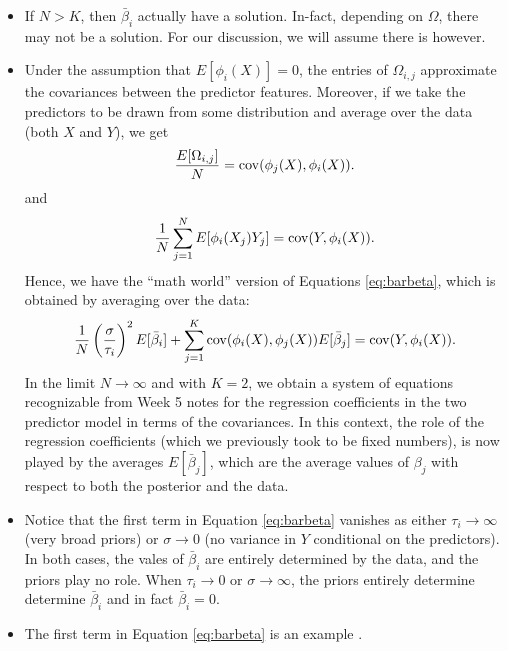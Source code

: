 \begin{itemize}
\item If $N> K$, then $\bar{\beta}_i$ actually have a solution. In-fact, depending on $\Omega$, there may not be a solution. For our discussion, we will assume there is however. 
\item Under the assumption that $E[\phi_i(X)]=0$, the entries of $\Omega_{i,j}$ approximate the covariances between the predictor features. Moreover, if we take the predictors to be drawn from some distribution and average over the data (both $X$ and $Y$), we get
\begin{equation*}
\frac{E[\Omega_{i,j}]}{N}=  {\rm cov}(\phi_j(X),\phi_i(X)).
\end{equation*}
and  
\begin{equation*}
\frac{1}{N}\sum_{j=1}^NE[\phi_i(X_j)Y_j]= {\rm cov}(Y,\phi_i(X)).
\end{equation*}
Hence, we have the ``math world'' version of Equations \ref{eq:barbeta}, which is obtained by averaging over the data: 
\begin{equation*}
 \frac{1}{N}\left(\frac{\sigma}{\tau_i}\right)^{2}E[\bar{\beta}_i]  + \sum_{j=1}^K{\rm cov}(\phi_i(X),\phi_j(X))E[\bar{\beta}_j] = {\rm cov}(Y,\phi_i(X)).
\end{equation*}
In the limit $N \to \infty$ and with $K=2$, we obtain a system of equations recognizable from Week 5 notes for the regression coefficients in the two predictor model in terms of the covariances. In this context, the role of the regression coefficients (which we previously took to be fixed numbers), is now played by the averages $E[\bar{\beta}_j]$, which are the average values of $\beta_j$ with respect to both the posterior and the data. 
\item Notice that the first term in  Equation \ref{eq:barbeta} vanishes as either $\tau_i \to \infty$ (very broad priors) or $\sigma \to 0$ (no variance in $Y$ conditional on the predictors). In both cases, the vales of $\bar{\beta}_i$ are entirely determined by the data, and the priors play no role. When $\tau_i \to 0$ or $\sigma \to \infty$, the priors entirely determine determine $\bar{\beta}_i$ and in fact $\bar{\beta}_i =0$. 
\item The first term in  Equation \ref{eq:barbeta} is an example . 
\end{itemize}


